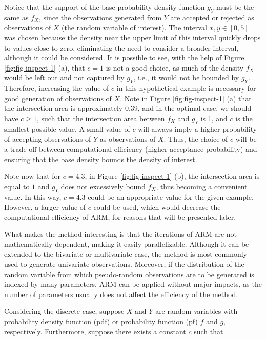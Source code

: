 Notice that the support of the base probability density function \(g_Y\) must be the same as \(f_X\), since the observations generated from \(Y\) are accepted or rejected as observations of \(X\) (the random variable of interest). The interval \(x,y \in [0, 5]\) was chosen because the density near the upper limit of this interval quickly drops to values close to zero, eliminating the need to consider a broader interval, although it could be considered. It is possible to see, with the help of Figure \ref{fig:fig-inspect-1} (a), that \(c = 1\) is not a good choice, as much of the density \(f_X\) would be left out and not captured by \(g_Y\), i.e., it would not be bounded by \(g_Y\). Therefore, increasing the value of \(c\) in this hypothetical example is necessary for good generation of observations of \(X\). Note in Figure \ref{fig:fig-inspect-1} (a) that the intersection area is approximately 0.39, and in the optimal case, we should have \(c \geq 1\), such that the intersection area between \(f_X\) and \(g_Y\) is 1, and \(c\) is the smallest possible value. A small value of \(c\) will always imply a higher probability of accepting observations of \(Y\) as observations of \(X\). Thus, the choice of \(c\) will be a trade-off between computational efficiency (higher acceptance probability) and ensuring that the base density bounds the density of interest.

Note now that for \(c = 4.3\), in Figure \ref{fig:fig-inspect-1} (b), the intersection area is equal to \(1\) and \(g_Y\) does not excessively bound \(f_X\), thus becoming a convenient value. In this way, \(c = 4.3\) could be an appropriate value for the given example. However, a larger value of \(c\) could be used, which would decrease the computational efficiency of ARM, for reasons that will be presented later.

What makes the method interesting is that the iterations of ARM are not mathematically dependent, making it easily parallelizable. Although it can be extended to the bivariate or multivariate case, the method is most commonly used to generate univariate observations. Moreover, if the distribution of the random variable from which pseudo-random observations are to be generated is indexed by many parameters, ARM can be applied without major impacts, as the number of parameters usually does not affect the efficiency of the method.

Considering the discrete case, suppose \(X\) and \(Y\) are random variables with probability density function (pdf) or probability function (pf) \(f\) and \(g\), respectively. Furthermore, suppose there exists a constant \(c\) such that

